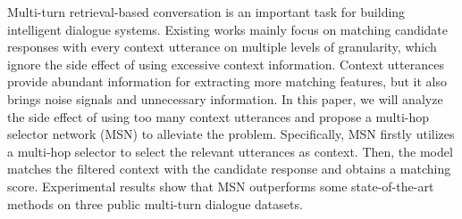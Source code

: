 Multi-turn retrieval-based conversation is an important task for building intelligent dialogue systems. Existing works mainly focus on matching candidate responses with every context utterance on multiple levels of granularity, which ignore the side effect of using excessive context information. Context utterances provide abundant information for extracting more matching features, but it also brings noise signals and unnecessary information. In this paper, we will analyze the side effect of using too many context utterances and propose a multi-hop selector network (MSN) to alleviate the problem. Specifically, MSN firstly utilizes a multi-hop selector to select the relevant utterances as context. Then, the model matches the filtered context with the candidate response and obtains a matching score. Experimental results show that MSN outperforms some state-of-the-art methods on three public multi-turn dialogue datasets.
